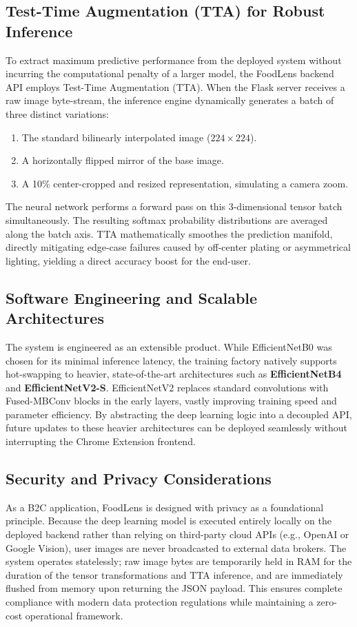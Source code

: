 \documentclass[conference]{IEEEtran}
\begin{document}
\subsection{Test-Time Augmentation (TTA) for Robust Inference}
To extract maximum predictive performance from the deployed system without incurring the computational penalty of a larger model, the FoodLens backend API employs Test-Time Augmentation (TTA). When the Flask server receives a raw image byte-stream, the inference engine dynamically generates a batch of three distinct variations:
\begin{enumerate}
    \item The standard bilinearly interpolated image ($224 \times 224$).
    \item A horizontally flipped mirror of the base image.
    \item A 10\% center-cropped and resized representation, simulating a camera zoom.
\end{enumerate}
The neural network performs a forward pass on this 3-dimensional tensor batch simultaneously. The resulting softmax probability distributions are averaged along the batch axis. TTA mathematically smoothes the prediction manifold, directly mitigating edge-case failures caused by off-center plating or asymmetrical lighting, yielding a direct accuracy boost for the end-user.

\subsection{Software Engineering and Scalable Architectures}
The system is engineered as an extensible product. While EfficientNetB0 was chosen for its minimal inference latency, the training factory natively supports hot-swapping to heavier, state-of-the-art architectures such as \textbf{EfficientNetB4} and \textbf{EfficientNetV2-S}. EfficientNetV2 replaces standard convolutions with Fused-MBConv blocks in the early layers, vastly improving training speed and parameter efficiency. By abstracting the deep learning logic into a decoupled API, future updates to these heavier architectures can be deployed seamlessly without interrupting the Chrome Extension frontend.

\subsection{Security and Privacy Considerations}
As a B2C application, FoodLens is designed with privacy as a foundational principle. Because the deep learning model is executed entirely locally on the deployed backend rather than relying on third-party cloud APIs (e.g., OpenAI or Google Vision), user images are never broadcasted to external data brokers. The system operates statelessly; raw image bytes are temporarily held in RAM for the duration of the tensor transformations and TTA inference, and are immediately flushed from memory upon returning the JSON payload. This ensures complete compliance with modern data protection regulations while maintaining a zero-cost operational framework.
\end{document}
